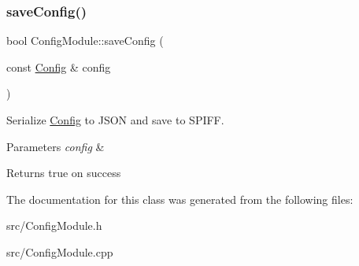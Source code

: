 \subsubsection{\texorpdfstring{saveConfig()}{saveConfig()}}
{\footnotesize\ttfamily bool Config\+Module\+::save\+Config (\begin{DoxyParamCaption}\item[{const \mbox{\hyperlink{struct_config}{Config}} \&}]{config }\end{DoxyParamCaption})}

Serialize \mbox{\hyperlink{struct_config}{Config}} to J\+S\+ON and save to S\+P\+I\+FF. 
\begin{DoxyParams}{Parameters}
{\em config} & \\
\hline
\end{DoxyParams}
\begin{DoxyReturn}{Returns}
true on success 
\end{DoxyReturn}


The documentation for this class was generated from the following files\+:\begin{DoxyCompactItemize}
\item 
src/Config\+Module.\+h\item 
src/Config\+Module.\+cpp\end{DoxyCompactItemize}

